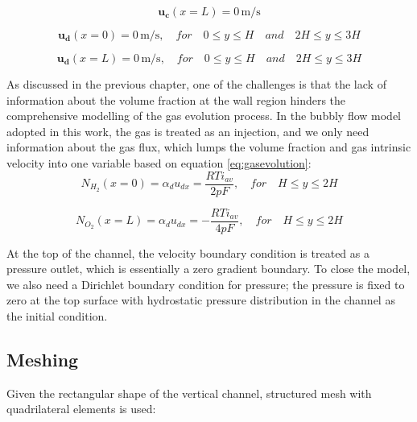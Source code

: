 \begin{equation}
    \mathbf{u_{c}}(x = L) = 0 \, \mathrm{ m/s }
\end{equation}

\begin{equation}
    \mathbf{u_{d}}(x = 0) = 0 \, \mathrm{ m/s }, \quad for  \quad 0 \leq y \leq H \quad and \quad 2H \leq y \leq 3H
\end{equation}

\begin{equation}
    \mathbf{u_{d}}(x = L) = 0 \, \mathrm{ m/s }, \quad for  \quad 0 \leq y \leq H \quad and \quad 2H \leq y \leq 3H
\end{equation}


As discussed in the previous chapter, one of the challenges is that the lack of information about the volume fraction at the wall region hinders the comprehensive modelling of the gas evolution process. In the bubbly flow model adopted in this work, the gas is treated as an injection, and we only need information about the gas flux, which lumps the volume fraction and gas intrinsic velocity into one variable based on equation \ref{eq:gasevolution}:
\begin{equation}\label{eq:hydrogenevolution}
    N_{H_2}(x = 0) = \alpha_d u_{dx} = \frac{RTi_{av}}{2pF}, \quad for  \quad H \leq y \leq 2H
\end{equation}

\begin{equation}\label{eq:oxygenevolution}
    N_{O_2}(x = L) = \alpha_d u_{dx} = -\frac{RTi_{av}}{4pF}, \quad for  \quad H \leq y \leq 2H
\end{equation}

At the top of the channel, the velocity boundary condition is treated as a pressure outlet, which is essentially a zero gradient boundary. To close the model, we also need a Dirichlet boundary condition for pressure; the pressure is fixed to zero at the top surface with hydrostatic pressure distribution in the channel as the initial condition.

\subsection{Meshing}

Given the rectangular shape of the vertical channel, structured mesh with quadrilateral elements is used:

